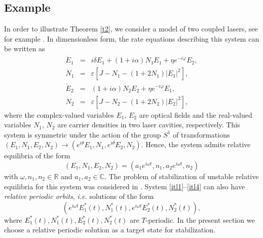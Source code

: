 \documentclass{article}
\let\temp\phi
\let\phi\varphi
\let\varphi\temp
\let\temp\epsilon
\let\epsilon\varepsilon
\let\varepsilon\epsilon
\newcommand{\R}{\mathbb{R}}
\newcommand{\C}{\mathbb{C}}
\begin{document}

\subsection{Example}\label{example2}

In order to illustrate Theorem \ref{t2}, we consider a model of two coupled lasers, see for example \cite{YanchukSchneider}.
In dimensionless form, the rate equations describing this system can be written as
\begin{eqnarray}
\dot{E}_1 &=& i \delta E_1 + (1+i \alpha)N_1E_1+\eta e^{-i\phi}E_2, \label{itl1} \\
\dot{N}_1 &=& \epsilon \left[J - N_1 - (1+2 N_1) |E_1|^2\right], \label{itl2} \\ 
\dot{E}_2 &=& (1+i\alpha)N_2E_2 + \eta e^{-i\phi}E_1, \label{itl3} \\
\dot{N}_2 &=& \epsilon \left[ J - N_2 - (1+2N_2)|E_2|^2\right], \label{itl4}
\end{eqnarray}
where the complex-valued variables $E_1$, $E_2$ are optical fields and the real-valued variables $N_1$, $N_2$ are carrier densities
in two laser cavities, respectively. %
This system is symmetric under the action of the group $S^1$ of transformations
$\left(E_1,N_1,E_2,N_2\right)\to \left(e^{i\theta}E_1,N_1,e^{i\theta}E_2,N_2\right)$.  Hence, the system admits relative equilibria of the form
\begin{equation}
\left(E_1, N_1, E_2, N_2\right) = \left(a_1 e^{i \omega t}, n_1, a_2 e^{i \omega t}, n_2\right) \label{relatEq}
\end{equation} with $\omega, n_1, n_2 \in \R $ and $a_1, a_2 \in \C$.
The problem of stabilization of unstable relative equilibria for this system was considered in \cite{FiedlerYanchuk}.
System \eqref{itl1}--\eqref{itl4} can also have {\it relative periodic orbits}, {\it i.e.} solutions of the form
\begin{equation}\label{tar}
	(e^{i \omega t} E_1^*(t), N_1^*(t), e^{i \omega t} E_2^*(t), N_2^*(t)),
\end{equation}
where $E_1^*(t), N_1^*(t), E_2^*(t), N_2^*(t)$ are $T$-periodic. 
In the present section we choose a relative periodic solution as a target state for stabilization.
\end{document}
